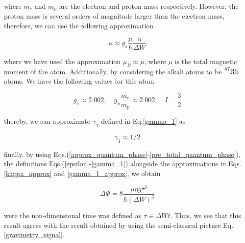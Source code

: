 \documentclass{article}
\begin{document}
where $m_{e}$ and $m_{p}$ are the electron and proton mass respectively. However, the proton mass is several orders of magnitude larger than the electron mass, therefore, we can use the following approximation

\begin{equation}\label{kappa_approx}
\kappa \approx g_{s}\frac{\mu }{\hbar} \frac{\eta}{\Delta W}
\end{equation}

where we have used the approximation $\mu_{B} \approx \mu$, where $\mu$ is the total magnetic moment of the atom. Additionally, by considering the alkali atoms to be $\ce{^{87}_{}Rb}$ atoms. We have the following values for this atom \cite{KAUSHALSK1970,Bunge1993}

\begin{equation}
g_{s} \approx 2.002 \mathrm{,}\quad g_{n} \frac{m_{e}}{m_{p}} \approx 2.002 \mathrm{,}\quad I = \frac{3}{2}
\end{equation}

thereby, we can approximate $\gamma_{1}$ defined in Eq.\ref{gamma_1} as

\begin{equation}\label{gamma_1_approx}
\gamma_{1} \approx 1/2
\end{equation}

finally, by using Eqs.(\ref{approx_quantum_phase}-\ref{pre_total_quantum_phase}), the definitions Eqs.(\ref{epsilon}-\ref{gamma_1}) alongside the approximations in Eqs. \ref{kappa_approx} and \ref{gamma_1_approx}, we obtain

\begin{equation}\label{quantum_gravimetry_signal}
\Delta \Phi = 8 \frac{\mu \eta g \tau^{3}}{\hbar (\Delta W)^{3}}
\end{equation}

were the non-dimensional time was defined as $\tau\equiv \Delta W t$. Thus, we see that this result agrees with the result obtained by using the semi-classical picture Eq.\ref{gravimetry_signal}.





\end{document}
